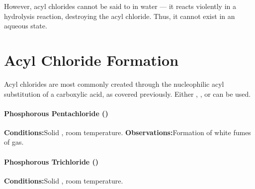 		However, acyl chlorides cannot be said to  in water --- it reacts violently in a hydrolysis reaction, destroying the
		acyl chloride. Thus, it cannot exist in an aqueous state.




	\pagebreak
	\section{Acyl Chloride Formation}

		Acyl chlorides are most commonly created through the nucleophilic acyl substitution of a carboxylic acid, as covered previously.
		Either , , or  can be used.


		\paragraph{Phosphorous Pentachloride ()}

		\vspace{1.5em}
		\vbox{\textbf{Conditions:}\tabto{35mm}Solid , room temperature.}
		\vbox{\textbf{Observations:}\tabto{35mm}Formation of white fumes of  gas.}



		\paragraph{Phosphorous Trichloride ()}

		\vspace{1.5em}
		\vbox{\textbf{Conditions:}\tabto{35mm}Solid , room temperature.}



